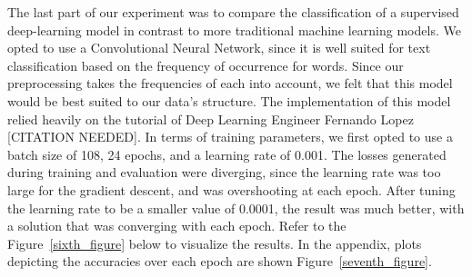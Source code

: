 \documentclass[10pt,twocolumn,letterpaper]{article}
\begin{document}
The last part of our experiment was to compare the classification of a supervised deep-learning model in contrast to more traditional machine learning models. We opted to use a Convolutional Neural Network, since it is well suited for text classification based on the frequency of occurrence for words. Since our preprocessing takes the frequencies of each into account, we felt that this model would be best suited to our data's structure. The implementation of this model relied heavily on the tutorial of Deep Learning Engineer Fernando Lopez [CITATION NEEDED]. In terms of training parameters, we first opted to use a batch size of 108, 24 epochs, and a learning rate of 0.001. The losses generated during training and evaluation were diverging, since the learning rate was too large for the gradient descent, and was overshooting at each epoch. After tuning the learning rate to be a smaller value of 0.0001, the result was much better, with a solution that was converging with each epoch. Refer to the Figure~\ref{sixth_figure} below to visualize the results. In the appendix, plots depicting the accuracies over each epoch are shown Figure~\ref{seventh_figure}.
\end{document}
